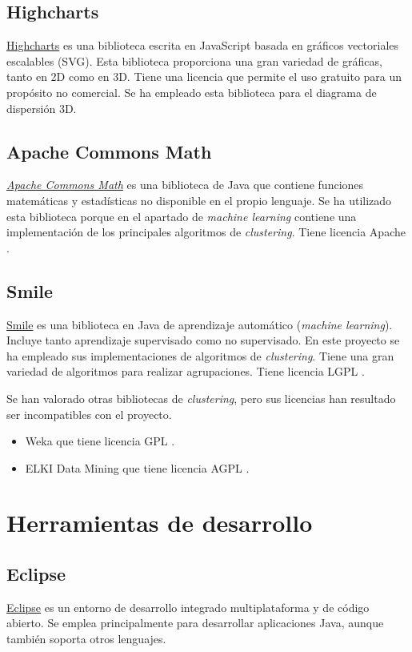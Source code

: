 \subsection{Highcharts}
\href{https://www.highcharts.com/}{Highcharts} es una biblioteca escrita en JavaScript basada en gráficos vectoriales escalables (SVG). Esta biblioteca proporciona una gran variedad de gráficas, tanto en 2D como en 3D. Tiene una licencia que permite el uso gratuito para un propósito no comercial. Se ha empleado esta biblioteca para el diagrama de dispersión 3D.

\subsection{Apache Commons Math}
\href{http://commons.apache.org/proper/commons-math/}{\emph{Apache Commons Math}} es una biblioteca de Java que contiene funciones matemáticas y estadísticas no disponible en el propio lenguaje. Se ha utilizado esta biblioteca porque en el apartado de \emph{machine learning} contiene una implementación de los principales algoritmos de \emph{clustering}. Tiene licencia Apache \cite{apacheLicense}.

\subsection{Smile}
\href{https://haifengl.github.io/}{Smile} es una biblioteca en Java de aprendizaje automático (\emph{machine learning}). Incluye tanto aprendizaje supervisado como no supervisado. En este proyecto se ha empleado sus implementaciones de algoritmos de \emph{clustering}. Tiene una gran variedad de algoritmos para realizar agrupaciones. Tiene licencia LGPL \cite{smileLicense}.

Se han valorado otras bibliotecas de \emph{clustering}, pero sus licencias han resultado ser incompatibles con el proyecto.
\begin{itemize}
	\item Weka que tiene licencia GPL \cite{wekaLicense}.
	\item ELKI Data Mining que tiene licencia AGPL \cite{ELKILicense}.
\end{itemize}


\section{Herramientas de desarrollo}
\subsection{Eclipse}
\href{https://www.eclipse.org/}{Eclipse} es un entorno de desarrollo integrado multiplataforma y de código abierto. Se emplea principalmente para desarrollar aplicaciones Java, aunque también soporta otros lenguajes.

